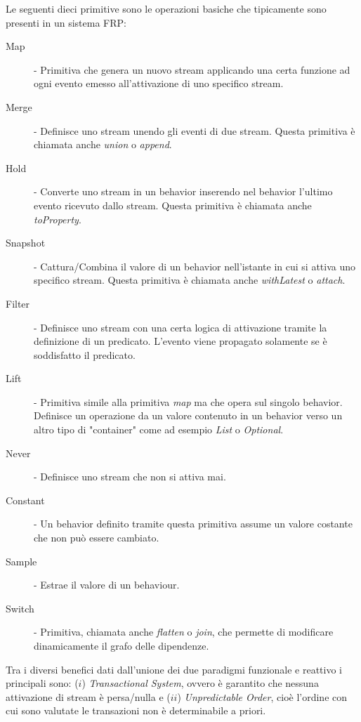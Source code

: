 \documentclass[../main.tex]{subfiles}
\begin{document}
Le seguenti dieci primitive sono le operazioni basiche che tipicamente sono presenti in un sistema FRP:
\begin{description}
    \item[Map] - Primitiva che genera un nuovo stream applicando una certa funzione ad ogni evento emesso all'attivazione di uno specifico stream.
    \item[Merge] - Definisce uno stream unendo gli eventi di due stream. Questa primitiva è chiamata anche \textit{union} o \textit{append}.
    \item[Hold] - Converte uno stream in un behavior inserendo nel behavior l'ultimo evento ricevuto dallo stream. Questa primitiva è chiamata anche \textit{toProperty}.
    \item[Snapshot] - Cattura/Combina il valore di un behavior nell'istante in cui si attiva uno specifico stream. Questa primitiva è chiamata anche \textit{withLatest} o \textit{attach}.
    \item[Filter] - Definisce uno stream con una certa logica di attivazione tramite la definizione di un predicato. L'evento viene propagato solamente se è soddisfatto il predicato.
    \item[Lift] - Primitiva simile alla primitiva \textit{map} ma che opera sul singolo behavior. Definisce un operazione da un valore contenuto in un behavior verso un altro tipo di "container" come ad esempio \textit{List} o \textit{Optional}.
    \item[Never] - Definisce uno stream che non si attiva mai.
    \item[Constant] - Un behavior definito tramite questa primitiva assume un valore costante che non può essere cambiato.
    \item[Sample] - Estrae il valore di un behaviour.
    \item[Switch] - Primitiva, chiamata anche \textit{flatten} o \textit{join}, che permette di modificare dinamicamente il grafo delle dipendenze.
\end{description}

Tra i diversi benefici dati dall'unione dei due paradigmi funzionale e reattivo i principali sono: ($i$) \textit{Transactional System}, ovvero è garantito che nessuna attivazione di stream è persa/nulla e ($ii$) \textit{Unpredictable Order}, cioè l'ordine con cui sono valutate le transazioni non è determinabile a priori.
\end{document}
